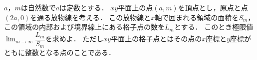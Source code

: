 \documentclass[../../main.tex]{subfiles}
\begin{document}
$a$，$m$は自然数で$a$は定数とする．
$xy$平面上の点$(a,m)$を頂点とし，原点と点$(2a,0)$を通る放物線を考える．
この放物線と$x$軸で囲まれる領域の面積を$S_m$，この領域の内部および境界線上にある格子点の数を$L_m$とする．
このとき極限値$\displaystyle\lim_{m\to\infty}\dfrac{L_m}{S_m}$を求めよ．
ただし$xy$平面上の格子点とはその点の$x$座標と$y$座標がともに整数となる点のことである．
\end{document}

